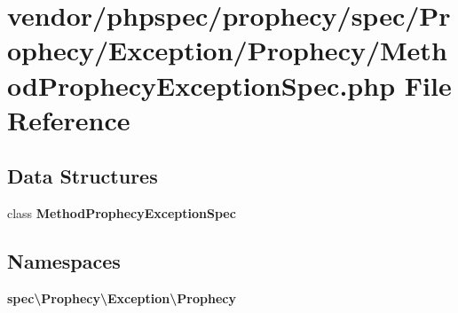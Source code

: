 \section{vendor/phpspec/prophecy/spec/\+Prophecy/\+Exception/\+Prophecy/\+Method\+Prophecy\+Exception\+Spec.php File Reference}
\label{_method_prophecy_exception_spec_8php}
\subsection*{Data Structures}
\begin{DoxyCompactItemize}
\item 
class {\bf Method\+Prophecy\+Exception\+Spec}
\end{DoxyCompactItemize}
\subsection*{Namespaces}
\begin{DoxyCompactItemize}
\item 
 {\bf spec\textbackslash{}\+Prophecy\textbackslash{}\+Exception\textbackslash{}\+Prophecy}
\end{DoxyCompactItemize}
